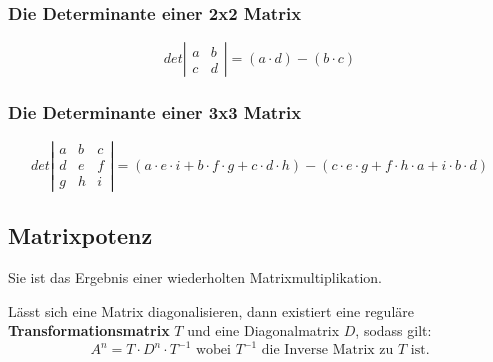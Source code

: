 \subsubsection{Die Determinante einer 2x2 Matrix}
\label{sec:determinante_2_2}

\[det\left|\begin{array}{cc}
a & b \\
c & d 
\end{array}\right|=(a\cdot d)-(b\cdot c)\]

\subsubsection{Die Determinante einer 3x3 Matrix}
\label{sec:determinante_3_3}
\[det\left|\begin{array}{ccc}
a & b & c\\
d & e & f\\
g & h & i
\end{array}\right|=(a\cdot e\cdot i+b\cdot f\cdot g+c\cdot d\cdot h)-(c\cdot e\cdot g+f\cdot h\cdot a+i\cdot b\cdot d)\]
\subsection{Matrixpotenz}\label{sec:matrixpotenz}
Sie ist das Ergebnis einer wiederholten Matrixmultiplikation.
\begin{satz}
Lässt sich eine Matrix diagonalisieren, dann existiert eine reguläre \textbf{Transformationsmatrix} $T$
und eine Diagonalmatrix $D$, sodass gilt: 
\[A^n=T\cdot D^n\cdot T^{-1} \text{ wobei $T^{-1}$ die Inverse Matrix zu $T$ ist.}\] 
\end{satz}

